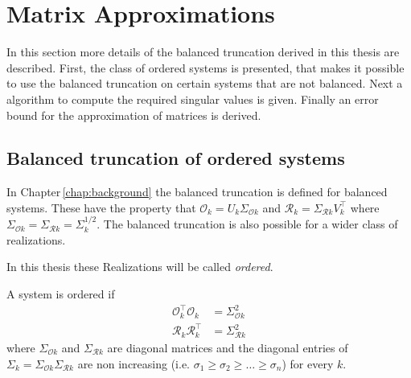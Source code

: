 \documentclass[numbers=noenddot,doctype=mastersthesis,BCOR=15mm,biblatex]{ldvbook}%
\DeclareMathOperator{\diag}{diag}
\newcommand{\R}{\mathcal{R}} %
\newcommand{\Ob}{\mathcal{O}} %
\begin{document}
\section{Matrix Approximations}\label{sec:approx}

In this section more details of the balanced truncation derived in this thesis are described.
First, the class of ordered systems is presented, that makes it possible to use the balanced truncation on certain systems that are not balanced.
Next a algorithm to compute the required singular values is given.
Finally an error bound for the approximation of matrices is derived.

\subsection{Balanced truncation of ordered systems}
In Chapter\,\ref{chap:background} the balanced truncation is defined for balanced systems.
These have the property that $\Ob_k = U_k \Sigma_{\Ob k}$ and $\R_k = \Sigma_{\R k} V_k^\top$ where $\Sigma_{\Ob k} = \Sigma_{\R k}=\Sigma_k^{1/2}$.
The balanced truncation is also possible for a wider class of realizations.

In this thesis these Realizations will be called  \emph{ordered}.
\begin{definition}
	A system is ordered if 
	\begin{subequations}
	\begin{align}
		\Ob_k^\top \Ob_k &= \Sigma_ {\Ob k}^2 \label{eq:orderd_obs}\\ %
		\R_k \R_k^\top &= \Sigma_ {\R k}^2 \label{eq:orderd_reach}%
	\end{align}
	\end{subequations}
	where $\Sigma_{\Ob k}$ and $\Sigma_{\R k}$ are diagonal matrices
	and the diagonal entries of $\Sigma_k =\Sigma_{\Ob k}\Sigma_{\R k}$ are non increasing (i.e. $\sigma_1 \geq \sigma_2 \geq \dots \geq \sigma_n$)
    for every $k$.
\end{definition}

\end{document}
